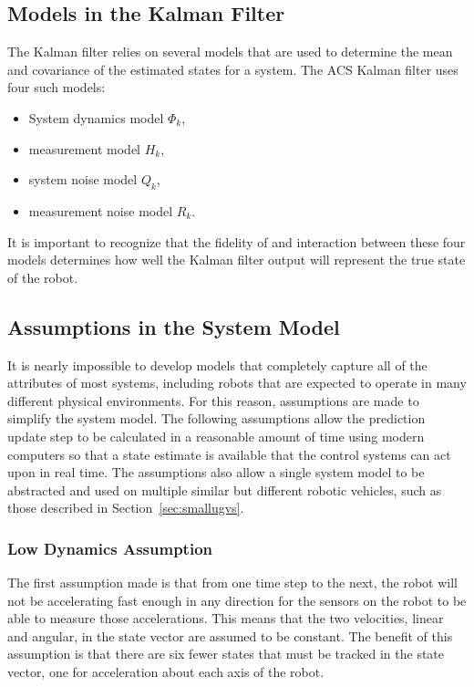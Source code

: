 \subsection{Models in the Kalman Filter}%
\label{sec:kfModels}
The Kalman filter relies on several models that are used to determine the mean and covariance of the estimated states for a system.
The ACS Kalman filter uses four such models:
\begin{itemize}
\item System dynamics model $\Phi_k$,
\item measurement model $H_k$,
\item system noise model $Q_k$,
\item measurement noise model $R_k$.
\end{itemize}

It is important to recognize that the fidelity of and interaction between these four models determines how well the Kalman filter output will represent the true state of the robot.

\subsection{Assumptions in the System Model}%
\label{sec:kfAssumptions}
It is nearly impossible to develop models that completely capture all of the attributes of most systems, including robots that are expected to operate in many different physical environments.
For this reason, assumptions are made to simplify the system model.
The following assumptions allow the prediction update step to be calculated in a reasonable amount of time using modern computers so that a state estimate is available that the control systems can act upon in real time.
The assumptions also allow a single system model to be abstracted and used on multiple similar but different robotic vehicles, such as those described in Section~\ref{sec:smallugvs}.

\subsubsection{Low Dynamics Assumption}%
\label{sec:kfLowDynamicsAssumption}
The first assumption made is that from one time step to the next, the robot will not be accelerating fast enough in any direction for the sensors on the robot to be able to measure those accelerations.
This means that the two velocities, linear and angular, in the state vector are assumed to be constant.
The benefit of this assumption is that there are six fewer states that must be tracked in the state vector, one for acceleration about each axis of the robot.

